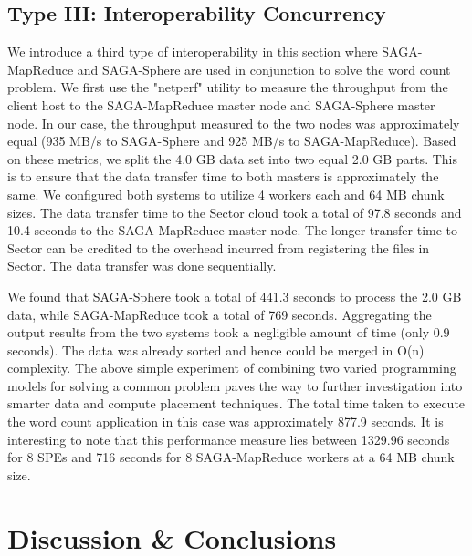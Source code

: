 \documentclass[3p,twocolumn]{elsarticle}
\begin{document}
\subsection{Type  III: Interoperability Concurrency}
We introduce a third type of interoperability in this section 
where SAGA-MapReduce and SAGA-Sphere are used in conjunction 
to solve the word count problem. We first use the "netperf" 
utility to measure the throughput from the client host to 
the SAGA-MapReduce master node and SAGA-Sphere master node. 
In our case, the throughput measured to the two nodes was 
approximately equal (935 MB/s to SAGA-Sphere and 925 MB/s to SAGA-MapReduce). 
Based on these metrics, we split the 4.0 GB data set 
into two equal 2.0 GB parts. This is to ensure that the data 
transfer time to both masters is approximately the same. We 
configured both systems to utilize 4 workers each 
and 64 MB chunk sizes. The data transfer time to the Sector 
cloud took a total of 97.8 seconds and 10.4 seconds to the 
SAGA-MapReduce master node. The longer transfer time to Sector 
can be credited to the overhead incurred from registering 
the files in Sector. The data transfer was done sequentially. 

We found that SAGA-Sphere took a total of 441.3 seconds to 
process the 2.0 GB data, while SAGA-MapReduce took a total of 
769 seconds. Aggregating the output results from the two systems 
took a negligible amount of time (only 0.9 seconds). The data was 
already sorted and hence could be merged in O(n) complexity. 
The above simple experiment of combining two varied programming 
models for solving a common problem paves the way to further 
investigation into smarter data and compute placement techniques. 
The total time taken to execute the word count application in this 
case was approximately 877.9 seconds. It is interesting to 
note that this performance measure lies between 1329.96 seconds 
for 8 SPEs and 716 seconds for 8 SAGA-MapReduce workers at 
a 64 MB chunk size. 



\section{Discussion \& Conclusions}
\label{sec:discuss}


\end{document}
